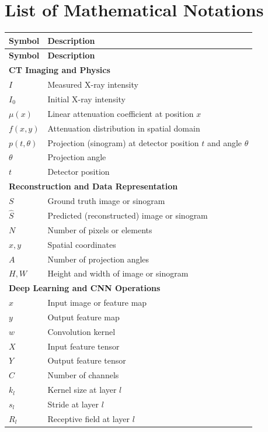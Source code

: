 

\chapter*{List of Mathematical Notations}

\renewcommand{\arraystretch}{1.3}

\begin{longtable}{ll}

\textbf{Symbol} & \textbf{Description} \\
\hline
\endfirsthead

\textbf{Symbol} & \textbf{Description} \\
\hline
\endhead

\multicolumn{2}{l}{\textbf{CT Imaging and Physics}} \\
\hline
$I$ & Measured X-ray intensity \\
$I_0$ & Initial X-ray intensity \\
$\mu(x)$ & Linear attenuation coefficient at position $x$ \\
$f(x,y)$ & Attenuation distribution in spatial domain \\
$p(t,\theta)$ & Projection (sinogram) at detector position $t$ and angle $\theta$ \\
$\theta$ & Projection angle \\
$t$ & Detector position \\

\multicolumn{2}{l}{\textbf{Reconstruction and Data Representation}} \\
\hline
$S$ & Ground truth image or sinogram \\
$\hat{S}$ & Predicted (reconstructed) image or sinogram \\
$N$ & Number of pixels or elements \\
$x, y$ & Spatial coordinates \\
$A$ & Number of projection angles \\
$H, W$ & Height and width of image or sinogram \\

\multicolumn{2}{l}{\textbf{Deep Learning and CNN Operations}} \\
\hline
$x$ & Input image or feature map \\
$y$ & Output feature map \\
$w$ & Convolution kernel \\
$X$ & Input feature tensor \\
$Y$ & Output feature tensor \\
$C$ & Number of channels \\
$k_l$ & Kernel size at layer $l$ \\
$s_l$ & Stride at layer $l$ \\
$R_l$ & Receptive field at layer $l$ \\


\end{longtable}
